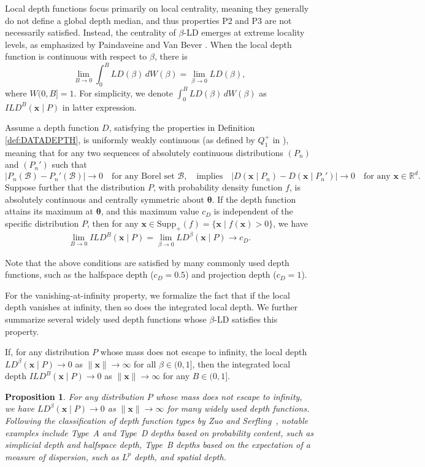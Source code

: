 \documentclass[final,3p,times]{elsarticle}
\newtheorem{pro}{\bf Proposition}[section]
\newcommand{\vecx}{\mathbf{x}}
\newcommand{\vectheta}{\boldsymbol\theta}
\begin{document}
Local depth functions focus primarily on local centrality, meaning they generally do not define a global depth median, and thus properties P2 and P3 are not necessarily satisfied. Instead, the centrality of $\beta$-LD emerges at extreme locality levels, as emphasized by Paindaveine and Van Bever \cite{paindaveine2013depth}. When the local depth function is continuous with respect to $\beta$, there is
\[
\lim\limits_{B \to 0} \int_0^B LD(\beta) \, dW(\beta) = \lim\limits_{\beta \to 0} LD(\beta),
\]
where $ W(0, B] = 1 $. For simplicity, we denote $ \int_0^B LD(\beta) \, dW(\beta)$ as $ ILD^B(\vecx \mid P) $ in latter expression.

\begin{property}\label{prop:central}
    Assume a depth function \(D\), satisfying the properties in Definition \ref{def:DATADEPTH}, is uniformly weakly continuous (as defined by \(Q_1^+\) in \cite{paindaveine2013depth}), meaning that for any two sequences of absolutely continuous distributions \((P_n)\) and \((P_n')\) such that
    \[
    |P_n(\mathcal{B}) - P_n'(\mathcal{B})| \to 0 \quad \text{for any Borel set } \mathcal{B},
    \quad \text{implies} \quad
    |D(\vecx \mid P_n) - D(\vecx \mid P_n')| \to 0 \quad \text{for any } \vecx \in \mathbb{R}^d.
    \]
    Suppose further that the distribution \(P\), with probability density function \(f\), is absolutely continuous and centrally symmetric about \(\vectheta\). If the depth function attains its maximum at \(\vectheta\), and this maximum value \(c_D\) is independent of the specific distribution \(P\), then for any \(\vecx \in \mathrm{Supp}_{+}(f) = \{\vecx \mid f(\vecx) > 0\}\), we have
    \[
    \lim\limits_{B \to 0} ILD^B(\vecx \mid P) = \lim\limits_{\beta \to 0} LD^\beta(\vecx \mid P) \to c_D.
    \]
\end{property}
Note that the above conditions are satisfied by many commonly used depth functions, such as the halfspace depth ($c_D = 0.5$) and projection depth ($c_D = 1$).

For the vanishing-at-infinity property, we formalize the fact that if the local depth vanishes at infinity, then so does the integrated local depth. We further summarize several widely used depth functions whose $\beta$-LD satisfies this property.
\begin{property} \label{prop:vanish}
If, for any distribution $P$ whose mass does not escape to infinity, the local depth $LD^\beta(\vecx \mid P) \to 0$ as $\|\vecx\| \to \infty$ for all $\beta\in(0, 1]$, then the integrated local depth $ILD^B(\vecx \mid P) \to 0$ as $\|\vecx\| \to \infty$ for any $B\in(0, 1]$.
\end{property}
\begin{pro}\label{pro:2}
For any distribution $P$ whose mass does not escape to infinity, we have $LD^\beta(\vecx \mid P) \to 0$ as $\|\vecx\| \to \infty$ for many widely used depth functions. Following the classification of depth function types by Zuo and Serfling~\cite{zuo2000general}, notable examples include Type~A and Type~D depths based on probability content, such as simplicial depth and halfspace depth, Type~B depths based on the expectation of a measure of dispersion, such as $L^p$ depth, and spatial depth.
\end{pro}
\end{document}
